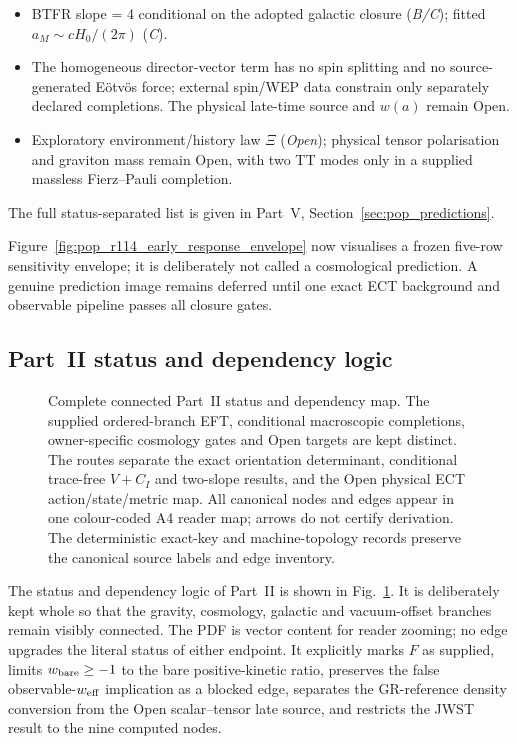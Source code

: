 \documentclass[11pt,a4paper]{article}
\begin{document}
\begin{itemize}
\item BTFR slope = 4 conditional on the adopted galactic closure (\emph{B/C}); fitted $a_M \sim cH_0/(2\pi)$ (\emph{C}).
\item The homogeneous director-vector term has no spin splitting and no source-generated E\"otv\"os force; external spin/WEP data constrain only separately declared completions.  The physical late-time source and $w(a)$ remain Open.
\item Exploratory environment/history law $\Xi$ (\emph{Open}); physical tensor polarisation and graviton mass remain Open, with two TT modes only in a supplied massless Fierz--Pauli completion.
\end{itemize}
The full status-separated list is given in Part~V,
Section~\ref{sec:pop_predictions}.

Figure~\ref{fig:pop_r114_early_response_envelope} now visualises a frozen five-row sensitivity envelope; it is deliberately not called a cosmological prediction.  A genuine prediction image remains deferred until one exact ECT background and observable pipeline passes all closure gates.

\subsection{Part~II status and dependency logic}

\begin{figure}[H]
\caption{Complete connected Part~II status and dependency map. The supplied ordered-branch EFT,
conditional macroscopic completions, owner-specific cosmology gates and Open
targets are kept distinct. The routes separate the exact orientation determinant,
conditional trace-free $V+C_I$ and two-slope results, and the Open physical
ECT action/state/metric map.  All canonical nodes and edges appear in one
colour-coded A4 reader map; arrows do not certify derivation.  The
deterministic exact-key and machine-topology records preserve the canonical
source labels and edge inventory.}
\label{fig:pop_partII_logic}
\end{figure}

The status and dependency logic of Part~II is shown in
Fig.~\ref{fig:pop_partII_logic}.  It is deliberately kept whole so that the
gravity, cosmology, galactic and vacuum-offset branches remain visibly
connected.  The PDF is vector content for reader zooming; no edge upgrades
the literal status of either endpoint.  It explicitly marks $F$ as supplied,
limits $w_{\rm bare}\ge-1$ to the bare positive-kinetic ratio, preserves the
false observable-$w_{\rm eff}$ implication as a blocked edge, separates the
GR-reference density conversion from the Open scalar--tensor late source, and
restricts the JWST result to the nine computed nodes.
\end{document}
